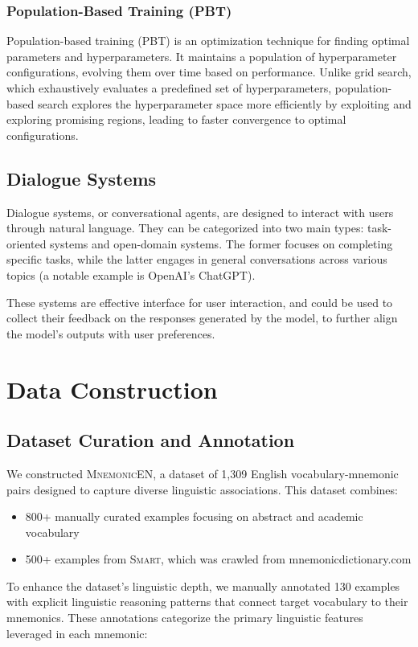 \documentclass{article}
\newcounter{para}
\begin{document}
\subsubsection{Population-Based Training (PBT)} \label{sec:pbt}

Population-based training (PBT) is an optimization technique for finding optimal parameters and hyperparameters. It maintains a population of hyperparameter configurations, evolving them over time based on performance. Unlike grid search, which exhaustively evaluates a predefined set of hyperparameters, population-based search explores the hyperparameter space more efficiently by exploiting and exploring promising regions, leading to faster convergence to optimal configurations.

\subsection{Dialogue Systems} \label{sec:dialogue}

Dialogue systems, or conversational agents, are designed to interact with users through natural language. They can be categorized into two main types: task-oriented systems and open-domain systems. The former focuses on completing specific tasks, while the latter engages in general conversations across various topics (a notable example is OpenAI's ChatGPT).

These systems are effective interface for user interaction, and could be used to collect their feedback on the responses generated by the model, to further align the model's outputs with user preferences.

\section{Data Construction} \label{sec:met-data}
\subsection{Dataset Curation and Annotation} \label{sec:curation}
We constructed \textsc{MnemonicEN}, a dataset of 1,309 English vocabulary-mnemonic pairs designed to capture diverse linguistic associations. This dataset combines:
\begin{itemize}
\item 800+ manually curated examples focusing on abstract and academic vocabulary
\item 500+ examples from \textsc{Smart}, which was crawled from mnemonicdictionary.com
\end{itemize}
To enhance the dataset's linguistic depth, we manually annotated 130 examples with explicit linguistic reasoning patterns that connect target vocabulary to their mnemonics. These annotations categorize the primary linguistic features leveraged in each mnemonic:
\end{document}
